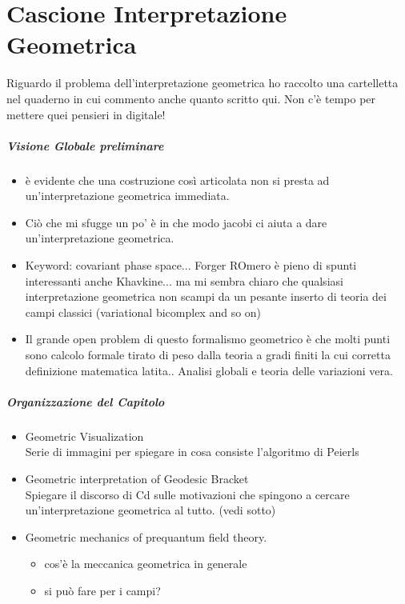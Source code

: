 \documentclass[Cascione]{subfiles}
\begin{document}
\chapter{Cascione Interpretazione Geometrica}

	\begin{Warning}
		Riguardo il problema dell'interpretazione geometrica ho raccolto una cartelletta nel quaderno in cui commento anche quanto scritto qui. Non c'è tempo per mettere quei pensieri in digitale!
	\end{Warning}


	\paragraph{Visione Globale preliminare}
		\begin{itemize}
			\item 		è evidente che una costruzione così articolata non si presta ad un'interpretazione geometrica immediata.
			\item 		Ciò che mi sfugge un po' è in che modo jacobi ci aiuta a dare  un'interpretazione geometrica.
			\item		Keyword: covariant phase space...  Forger ROmero è pieno di spunti interessanti anche Khavkine... ma mi sembra chiaro che qualsiasi interpretazione geometrica non scampi da un pesante inserto di teoria dei campi classici (variational bicomplex and so on)
			\item		Il grande open problem di questo formalismo geometrico è che molti punti sono calcolo formale tirato di peso dalla teoria a gradi finiti la cui corretta definizione matematica latita.. Analisi globali e teoria delle variazioni vera.
		\end{itemize}

	\paragraph{Organizzazione del Capitolo}
		\begin{itemize}
			\item Geometric Visualization\\
				Serie di immagini per spiegare in cosa consiste l'algoritmo di Peierls
			\item Geometric interpretation of Geodesic Bracket \\
				Spiegare il discorso di Cd sulle motivazioni che spingono a cercare un'interpretazione geometrica al tutto. (vedi sotto)
			\item Geometric mechanics of prequantum field theory.
				\begin{itemize}
					\item cos'è la meccanica geometrica in generale
					\item si può fare per i campi?
				\end{itemize}
		\end{itemize}
\end{document}
